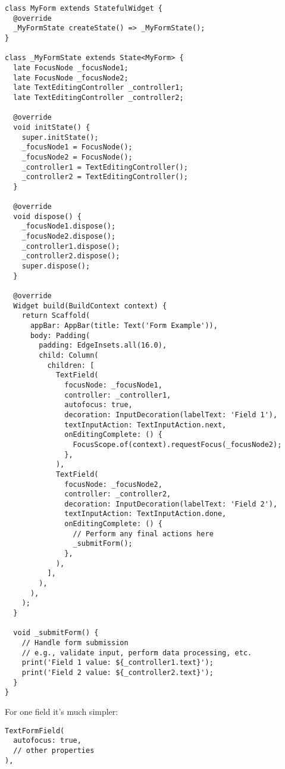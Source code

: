 \begin{lstlisting}
class MyForm extends StatefulWidget {
  @override
  _MyFormState createState() => _MyFormState();
}

class _MyFormState extends State<MyForm> {
  late FocusNode _focusNode1;
  late FocusNode _focusNode2;
  late TextEditingController _controller1;
  late TextEditingController _controller2;

  @override
  void initState() {
    super.initState();
    _focusNode1 = FocusNode();
    _focusNode2 = FocusNode();
    _controller1 = TextEditingController();
    _controller2 = TextEditingController();
  }

  @override
  void dispose() {
    _focusNode1.dispose();
    _focusNode2.dispose();
    _controller1.dispose();
    _controller2.dispose();
    super.dispose();
  }

  @override
  Widget build(BuildContext context) {
    return Scaffold(
      appBar: AppBar(title: Text('Form Example')),
      body: Padding(
        padding: EdgeInsets.all(16.0),
        child: Column(
          children: [
            TextField(
              focusNode: _focusNode1,
              controller: _controller1,
              autofocus: true,
              decoration: InputDecoration(labelText: 'Field 1'),
              textInputAction: TextInputAction.next,
              onEditingComplete: () {
                FocusScope.of(context).requestFocus(_focusNode2);
              },
            ),
            TextField(
              focusNode: _focusNode2,
              controller: _controller2,
              decoration: InputDecoration(labelText: 'Field 2'),
              textInputAction: TextInputAction.done,
              onEditingComplete: () {
                // Perform any final actions here
                _submitForm();
              },
            ),
          ],
        ),
      ),
    );
  }

  void _submitForm() {
    // Handle form submission
    // e.g., validate input, perform data processing, etc.
    print('Field 1 value: ${_controller1.text}');
    print('Field 2 value: ${_controller2.text}');
  }
}
\end{lstlisting}

For one field it's much simpler:

\begin{lstlisting}
TextFormField(
  autofocus: true,
  // other properties
),
\end{lstlisting}